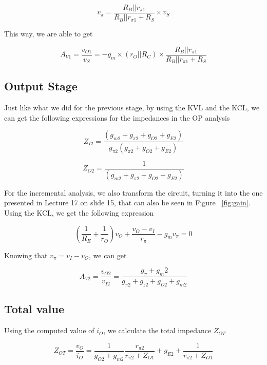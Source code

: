 \begin{equation}
v_\pi = \frac{R_B||r_{\pi 1}}{R_B||r_{\pi 1}+R_S} \times v_S
\label{eq:1.4}
\end{equation}

This way, we are able to get

\begin{equation}
A_{V1} = \frac{v_{O1}}{v_S} = -g_m \times (r_O||R_C) \times \frac{R_B||r_{\pi 1}}{R_B||r_{\pi 1}+R_S}
\label{eq:1.5}
\end{equation}

\subsection{Output Stage}
Just like what we did for the previous stage, by using the KVL and the KCL, we can get the following expressions for the impedances in the OP analysis

\begin{equation}
Z_{I2} = \frac{(g_{m2}+g_{\pi 2}+g_{O2}+g_{E2})}{g_{\pi 2}(g_{\pi 2}+g_{O2}+g_{E2})}
\label{eq:1.6}
\end{equation}

\begin{equation}
Z_{O2} = \frac{1}{(g_{m2}+g_{\pi 2}+g_{O2}+g_{E2})}
\label{eq:1.7}
\end{equation}

For the incremental analysis, we also transform the circuit, turning it into the one presented in Lecture 17 on slide 15, that can also be seen in Figure ~\ref{fig:gain}. Using the KCL, we get the following expression

\begin{equation}
(\frac{1}{R_E}+\frac{1}{r_O})v_O+\frac{v_O-v_I}{r_\pi}-g_mv_\pi = 0
\label{eq:1.8}
\end{equation}

Knowing that $v_\pi = v_I - v_O$, we can get

\begin{equation}
A_{V2} = \frac{v_{O2}}{v_{I2}} = \frac{g_\pi+g_m2}{g_{\pi 2}+g_{z2}+g_{O2}+g_{m2}}
\label{eq:1.9}
\end{equation}

\subsection{Total value}
Using the computed value of $i_O$, we calculate the total impedance $Z_{OT}$

\begin{equation}
Z_{OT} = \frac{v_O}{i_O} = \frac{1}{g_{O2}+g_{m2}}\frac{r_{\pi 2}}{r_{\pi 2} + Z_{O1}}+g_{E2}+\frac{1}{r_{\pi 2} + Z_{O1}}
\label{eq:1.10}
\end{equation}

